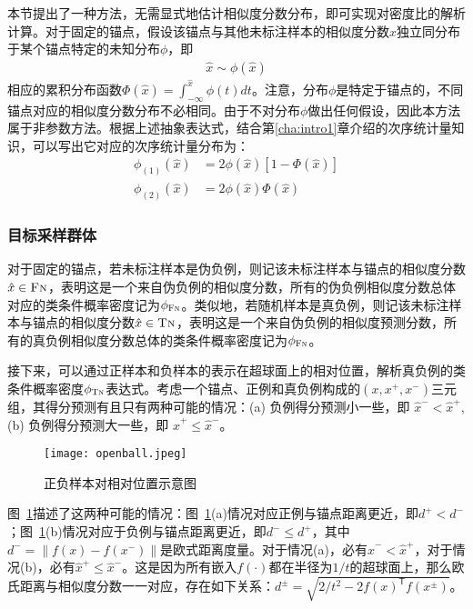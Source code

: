本节提出了一种方法，无需显式地估计相似度分数分布，即可实现对密度比的解析计算。对于固定的锚点，假设该锚点与其他未标注样本的相似度分数$\hat{x}$独立同分布于某个锚点特定的未知分布$\phi$，即
\begin{eqnarray}
\hat{x} \sim \phi(\hat{x})
\end{eqnarray}
相应的累积分布函数$\Phi(\hat{x})=\int_{-\infty}^{\hat{x}} \phi(t) dt$。注意，分布$\phi$是特定于锚点的，不同锚点对应的相似度分数分布不必相同。由于不对分布$\phi$做出任何假设，因此本方法属于非参数方法。根据上述抽象表达式，结合第\ref{cha:intro1}章介绍的次序统计量知识，可以写出它对应的次序统计量分布为：
\begin{align}
	\phi_{(1)}(\hat{x}) &= 2\phi(\hat{x}) [1-\Phi(\hat{x})] \label{eq:order1} \\
	\phi_{(2)}(\hat{x}) &= 2\phi(\hat{x}) \Phi(\hat{x}) \label{eq:order2}
\end{align}

\subsubsection{目标采样群体}
对于固定的锚点，若未标注样本是伪负例，则记该未标注样本与锚点的相似度分数$\hat{x} \in \textsc{Fn}$，表明这是一个来自伪负例的相似度分数，所有的伪负例相似度分数总体对应的类条件概率密度记为$\phi_\textsc{Fn}$。类似地，若随机样本是真负例，则记该未标注样本与锚点的相似度分数$\hat{x} \in \textsc{Tn}$，表明这是一个来自伪负例的相似度预测分数，所有的真负例相似度分数总体的类条件概率密度记为$\phi_\textsc{Fn}$。

接下来，可以通过正样本和负样本的表示在超球面上的相对位置，解析真负例的类条件概率密度$\phi_{\textsc{Tn}}$表达式。考虑一个锚点、正例和真负例构成的$(x, x^+, x^-)$三元组，其得分预测有且只有两种可能的情况：(a) 负例得分预测小一些，即 $ \hat{x}^- < \hat{x}^+ $, (b) 负例得分预测大一些，即 $ \hat{x}^+ \leq \hat{x}^- $。



\begin{figure}[!]
	\centering
	\texttt{[image: openball.jpeg]}
	\caption{正负样本对相对位置示意图}
	\label{Fig:openball}
\end{figure}

图~\ref{Fig:openball}描述了这两种可能的情况：图~\ref{Fig:openball}(a)情况对应正例与锚点距离更近，即$ d^+ < d^- $；图~\ref{Fig:openball}(b)情况对应于负例与锚点距离更近，即$ d^- \leq d^+ $，其中$ d^{-}=\|f(x) - f(x^-)\|$是欧式距离度量。对于情况(a)，必有$ \hat{x}^- < \hat{x}^+ $，对于情况(b)，必有$ \hat{x}^+ \leq \hat{x}^- $。这是因为所有嵌入$ f(\cdot) $都在半径为$ 1/t $的超球面上，那么欧氏距离与相似度分数一一对应，存在如下关系：$ d^\pm = \sqrt{2/t^2 - 2f(x)^\mathsf{T} f(x^\pm)}$。

